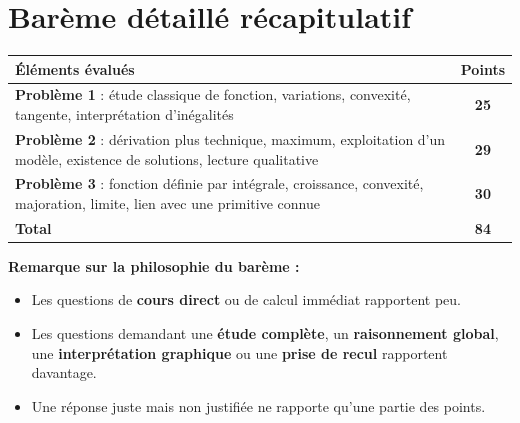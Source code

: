 \documentclass[11pt,a4paper]{article}
\begin{document}
\vspace{1em}

\section*{Barème détaillé récapitulatif}

\renewcommand{\arraystretch}{1.25}
\begin{tabularx}{\linewidth}{|Y|c|}
\hline
\textbf{Éléments évalués} & \textbf{Points} \\
\hline
\textbf{Problème 1} : étude classique de fonction, variations, convexité, tangente, interprétation d'inégalités & \textbf{25} \\
\hline
\textbf{Problème 2} : dérivation plus technique, maximum, exploitation d'un modèle, existence de solutions, lecture qualitative & \textbf{29} \\
\hline
\textbf{Problème 3} : fonction définie par intégrale, croissance, convexité, majoration, limite, lien avec une primitive connue & \textbf{30} \\
\hline
\textbf{Total} & \textbf{84} \\
\hline
\end{tabularx}

\vspace{1em}

\noindent\textbf{Remarque sur la philosophie du barème :}
\begin{itemize}
    \item Les questions de \textbf{cours direct} ou de calcul immédiat rapportent peu.
    \item Les questions demandant une \textbf{étude complète}, un \textbf{raisonnement global}, une \textbf{interprétation graphique} ou une \textbf{prise de recul} rapportent davantage.
    \item Une réponse juste mais non justifiée ne rapporte qu'une partie des points.
\end{itemize}

\vspace{1em}

\begin{center}
\end{center}
\end{document}
